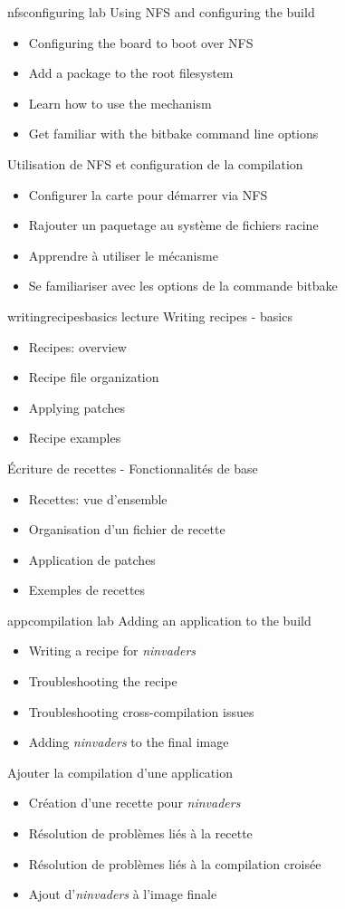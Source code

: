 {nfsconfiguring}
{lab}
{Using NFS and configuring the build}
{
  \begin{itemize}
  \item Configuring the board to boot over NFS
  \item Add a package to the root filesystem
  \item Learn how to use the  mechanism
  \item Get familiar with the bitbake command line options
  \end{itemize}
}
{Utilisation de NFS et configuration de la compilation}
{
  \begin{itemize}
  \item Configurer la carte pour démarrer via NFS
  \item Rajouter un paquetage au système de fichiers racine
  \item Apprendre à utiliser le mécanisme 
  \item Se familiariser avec les options de la commande bitbake
  \end{itemize}
}

{writingrecipesbasics}
{lecture}
{Writing recipes - basics}
{
  \begin{itemize}
  \item Recipes: overview
  \item Recipe file organization
  \item Applying patches
  \item Recipe examples
  \end{itemize}
}
{Écriture de recettes - Fonctionnalités de base}
{
  \begin{itemize}
  \item Recettes: vue d'ensemble
  \item Organisation d'un fichier de recette
  \item Application de patches
  \item Exemples de recettes
  \end{itemize}
}

{appcompilation}
{lab}
{Adding an application to the build}
{
  \begin{itemize}
  \item Writing a recipe for {\em ninvaders}
  \item Troubleshooting the recipe
  \item Troubleshooting cross-compilation issues
  \item Adding {\em ninvaders} to the final image
  \end{itemize}
}
{Ajouter la compilation d'une application}
{
  \begin{itemize}
  \item Création d'une recette pour {\em ninvaders}
  \item Résolution de problèmes liés à la recette
  \item Résolution de problèmes liés à la compilation croisée
  \item Ajout d'{\em ninvaders} à l'image finale
  \end{itemize}
}

